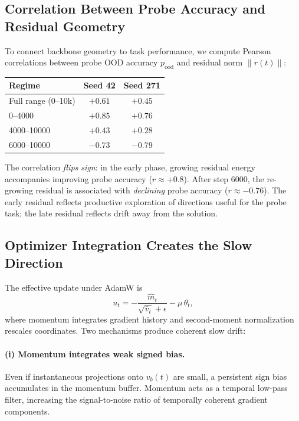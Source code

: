 \documentclass[11pt,a4paper]{article}
\begin{document}
\subsection{Correlation Between Probe Accuracy and Residual Geometry}

To connect backbone geometry to task performance, we compute Pearson correlations between probe OOD accuracy $p_{\mathrm{ood}}$ and residual norm $\|r(t)\|$:

\begin{center}
\begin{tabular}{lcc}
\toprule
Regime & Seed 42 & Seed 271 \\
\midrule
Full range (0--10k) & $+0.61$ & $+0.45$ \\
0--4000 & $+0.85$ & $+0.76$ \\
4000--10000 & $+0.43$ & $+0.28$ \\
6000--10000 & $-0.73$ & $-0.79$ \\
\bottomrule
\end{tabular}
\end{center}

The correlation \emph{flips sign}: in the early phase, growing residual energy accompanies improving probe accuracy ($r \approx +0.8$). After step 6000, the re-growing residual is associated with \emph{declining} probe accuracy ($r \approx -0.76$). The early residual reflects productive exploration of directions useful for the probe task; the late residual reflects drift away from the solution.


\subsection{Optimizer Integration Creates the Slow Direction}\label{sec:optimizer-integration}

The effective update under AdamW is
%
\[
u_t = -\frac{\hat{m}_t}{\sqrt{\hat{v}_t} + \epsilon} - \mu\,\theta_t,
\]
%
where momentum integrates gradient history and second-moment normalization rescales coordinates. Two mechanisms produce coherent slow drift:

\paragraph{(i) Momentum integrates weak signed bias.} Even if instantaneous projections onto $v_b(t)$ are small, a persistent sign bias accumulates in the momentum buffer. Momentum acts as a temporal low-pass filter, increasing the signal-to-noise ratio of temporally coherent gradient components.
\end{document}
